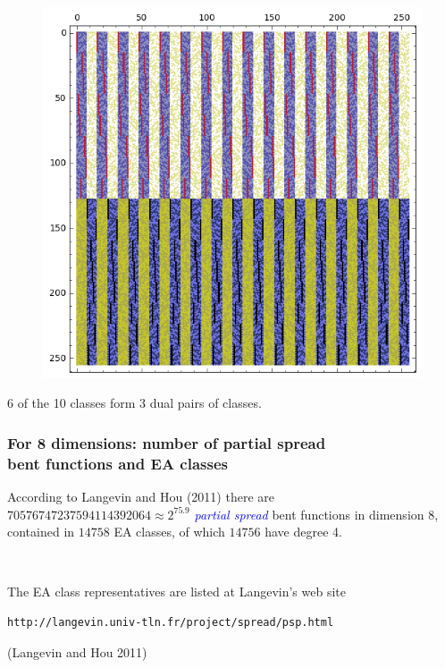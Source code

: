 \documentclass[pdf,sprung,slideColor,nocolorBG]{beamer}
\newenvironment{colortheme}[1]{
\def\ProvidesPackageRCS $##1${\relax}
\renewcommand{\ProcessOptions}{\relax}
\makeatletter

\makeatother
}{}
\newcommand{\slidecite}[1]{\tiny{(#1)}\normalsize{}}
\newcommand{\Emph}[1]{\emph{\textcolor{blue}{#1}}}
\begin{document}
\begin{colortheme}{jubata}
\begin{frame}
\begin{figure}
\begin{minipage}{.48\textwidth}
  \label{fig:c8_10_bent_cayley_graph_index_matrix}
\end{minipage}
\begin{minipage}{.48\textwidth}
  \centering
  \includegraphics[width=.9\linewidth]{../matrix_plot/re8_10_dual_cayley_graph_index_matrix.png}
  \label{fig:c8_10_dual_cayley_graph_index_matrix}
\end{minipage}%
\end{figure}
6 of the 10 classes form 3 dual pairs of classes.
\end{frame}
\end{colortheme}
\begin{colortheme}{seagull}
\begin{frame}[fragile]
\frametitle{For 8 dimensions: number of partial spread \\ bent functions and EA classes}

According to Langevin and Hou (2011)
there are $70576747237594114392064 \approx 2^{75.9}$ \Emph{partial spread} bent functions in dimension 8,
contained in $14758$ EA classes, of which $14756$ have degree 4.

~

The EA class representatives are listed at Langevin's web site

\begin{verbatim}
http://langevin.univ-tln.fr/project/spread/psp.html
\end{verbatim}

\slidecite{Langevin and Hou 2011}
\end{frame}
\end{colortheme}
\end{document}
